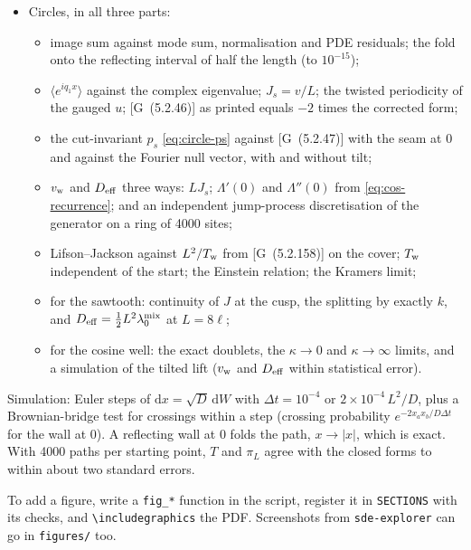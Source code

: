 \documentclass[11pt]{article}
\numberwithin{equation}{section}
\newcommand{\dd}{\mathrm{d}}
\newcommand{\avg}[1]{\langle #1\rangle}
\newcommand{\G}[1]{[G~(#1)]}
\begin{document}
\begin{itemize}
        converges to the Rayleigh QSD.
  \item Circles, in all three parts:
        \begin{itemize}
          \item image sum against mode sum, normalisation and PDE residuals; the fold onto the reflecting
                interval of half the length (to $10^{-15}$);
          \item $\avg{e^{iq_1x}}$ against the complex eigenvalue; $J_s=v/L$; the twisted periodicity of the
                gauged $u$; \G{5.2.46} as printed equals $-2$ times the corrected form;
          \item the cut-invariant $p_s$ \cref{eq:circle-ps} against \G{5.2.47} with the seam at $0$ and against
                the Fourier null vector, with and without tilt;
          \item $v_{\rm w}$ and $D_{\rm eff}$ three ways: $LJ_s$; $\Lambda'(0)$ and $\Lambda''(0)$ from
                \cref{eq:cos-recurrence}; and an independent jump-process discretisation of the generator on a
                ring of 4000 sites;
          \item Lifson--Jackson against $L^2/T_{\rm w}$ from \G{5.2.158} on the cover; $T_{\rm w}$ independent
                of the start; the Einstein relation; the Kramers limit;
          \item for the sawtooth: continuity of $J$ at the cusp, the splitting by exactly $k$, and
                $D_{\rm eff}=\tfrac12L^2\lambda_0^{\rm mix}$ at $L=8\ell$;
          \item for the cosine well: the exact doublets, the $\kappa\to0$ and $\kappa\to\infty$ limits, and a
                simulation of the tilted lift ($v_{\rm w}$ and $D_{\rm eff}$ within statistical error).
        \end{itemize}
\end{itemize}
Simulation: Euler steps of $\dd x=\sqrt D\,\dd W$ with $\Delta t=10^{-4}$ or $2\times10^{-4}\,L^2/D$, plus a
Brownian-bridge test for crossings within a step (crossing probability $e^{-2x_ax_b/D\Delta t}$ for the wall
at $0$). A reflecting wall at $0$ folds the path, $x\to\lvert x\rvert$, which is exact. With 4000 paths per
starting point, $T$ and $\pi_L$ agree with the closed forms to within about two standard errors.

To add a figure, write a \texttt{fig\_*} function in the script, register it in \texttt{SECTIONS} with its
checks, and \verb|\includegraphics| the PDF. Screenshots from \texttt{sde-explorer} can go in
\texttt{figures/} too.
\end{document}

